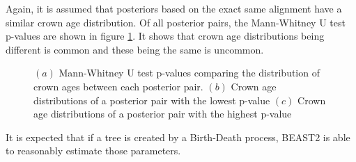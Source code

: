 Again, it is assumed that posteriors based on the exact same alignment
have a similar crown age distribution. Of all posterior pairs, the Mann-Whitney
U test p-values are shown in figure \ref{fig:figure_posterior_distribution_crown_ages_p_values}.
It shows that crown age distributions being different is common and these
being the same is uncommon. 

\begin{figure}[!htbp]
  \caption{
    $(a)$ Mann-Whitney U test p-values comparing the distribution of crown ages
    between each posterior pair.
    $(b)$ Crown age distributions of a posterior pair with the lowest p-value
    $(c)$ Crown age distributions of a posterior pair with the highest p-value
  }
  \label{fig:figure_posterior_distribution_crown_ages_p_values}
\end{figure}

It is expected that if a tree is created by a Birth-Death process, BEAST2 is able
to reasonably estimate those parameters.






